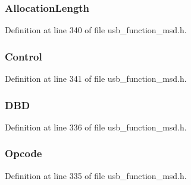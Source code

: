 \subsubsection[{Allocation\+Length}]{ Allocation\+Length}\label{struct_mode_sense_c_b_a8c0a66f23ee960de672d690626364354}


Definition at line 340 of file usb\+\_\+function\+\_\+msd.\+h.

\hypertarget{struct_mode_sense_c_b_a5dc24656c27deb12af74c98930f0bfc5}{}
\subsubsection[{Control}]{ Control}\label{struct_mode_sense_c_b_a5dc24656c27deb12af74c98930f0bfc5}


Definition at line 341 of file usb\+\_\+function\+\_\+msd.\+h.

\hypertarget{struct_mode_sense_c_b_a41546dd3008b70b9cef1ab0dfbca1584}{}
\subsubsection[{D\+B\+D}]{ D\+B\+D}\label{struct_mode_sense_c_b_a41546dd3008b70b9cef1ab0dfbca1584}


Definition at line 336 of file usb\+\_\+function\+\_\+msd.\+h.

\hypertarget{struct_mode_sense_c_b_a3ac7536b907732d60214ae553910eed9}{}
\subsubsection[{Opcode}]{ Opcode}\label{struct_mode_sense_c_b_a3ac7536b907732d60214ae553910eed9}


Definition at line 335 of file usb\+\_\+function\+\_\+msd.\+h.

\hypertarget{struct_mode_sense_c_b_a53ee9769775f645af63931eb0fef7922}{}
